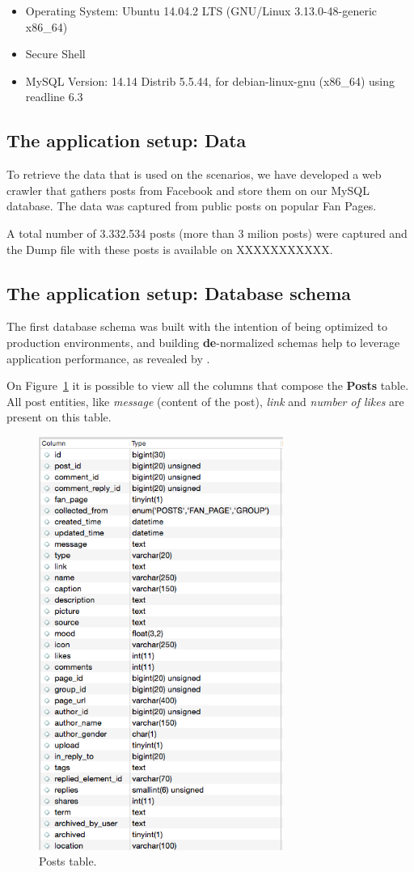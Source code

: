 \begin{itemize}
\item{Operating System: Ubuntu 14.04.2 LTS (GNU/Linux 3.13.0-48-generic x86\_64)}
\item{Secure Shell}
\item{MySQL Version: 14.14 Distrib 5.5.44, for debian-linux-gnu (x86\_64) using readline 6.3}
\end{itemize}

\subsection{The application setup: Data}
To retrieve the data that is used on the scenarios, we have developed a web crawler that gathers posts from Facebook and store them on our MySQL database. The data was captured from public posts on popular Fan Pages.

A total number of 3.332.534 posts (more than 3 milion posts) were captured and the Dump file with these posts is available on XXXXXXXXXXX. 

\subsection{The application setup: Database schema}
The first database schema was built with the intention of being optimized to production environments, and building \textbf{de}-normalized schemas help to leverage application performance, as revealed by \cite{926306}. 

On Figure~\ref{fig:postsTable} it is possible to view all the columns that compose the \textbf{Posts} table. All post entities, like \textit{message} (content of the post), \textit{link} and \textit{number of likes} are present on this table. 

\begin{figure}[ht!]
\centering
\includegraphics[width=80mm]{postTable.png}
\caption{Posts table.\label{fig:postsTable}}
\end{figure}

